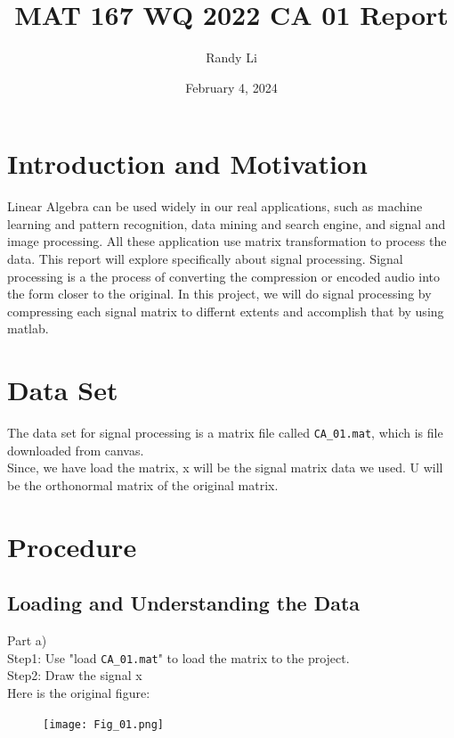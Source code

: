 \documentclass{article}
\title{MAT 167 WQ 2022 CA 01 Report}
\author{Randy Li} %
\date{February 4, 2024}
\begin{document}
\maketitle
\tableofcontents
\newpage

\section{Introduction and Motivation}
Linear Algebra can be used widely in our real applications, such as machine learning and pattern recognition, data mining and search engine, and signal and image processing. All these application use matrix transformation to process the data. This report will explore specifically about signal processing. Signal processing is a the process of converting the compression or encoded audio into the form closer to the original. In this project, we will do signal processing by compressing each signal matrix to differnt extents and accomplish that by using matlab. 

\section{Data Set}

The data set for signal processing is a matrix file called \texttt{CA\_01.mat}, which is file downloaded from canvas.\\
Since, we have load the matrix, x will be the signal matrix data we used. U will be the orthonormal matrix of the original matrix. \\


\section{Procedure}

\subsection{Loading and Understanding the Data}
Part a)\\
Step1: Use "load \texttt{CA\_01.mat}" to load the matrix to the project.\\
Step2: Draw the signal x\\
Here is the original figure:\\
\begin{figure}[H]
  \centering
  \texttt{[image: Fig\_01.png]}
  \label{fig_01}
\end{figure}
\end{document}
